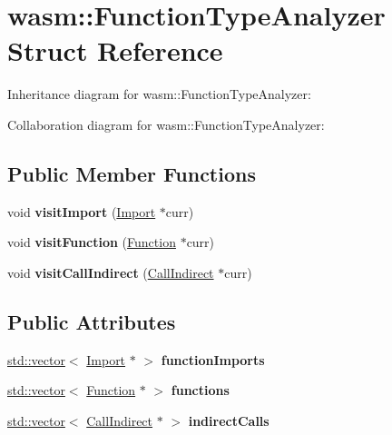 \hypertarget{structwasm_1_1_function_type_analyzer}{}\section{wasm\+:\+:Function\+Type\+Analyzer Struct Reference}
\label{structwasm_1_1_function_type_analyzer}


Inheritance diagram for wasm\+:\+:Function\+Type\+Analyzer\+:


Collaboration diagram for wasm\+:\+:Function\+Type\+Analyzer\+:
\subsection*{Public Member Functions}
\begin{DoxyCompactItemize}
\item 
\mbox{\label{structwasm_1_1_function_type_analyzer_a40df757d6f8b733f38a118ea64ba549b}} 
void {\bfseries visit\+Import} (\mbox{\hyperlink{classwasm_1_1_import}{Import}} $\ast$curr)
\item 
\mbox{\label{structwasm_1_1_function_type_analyzer_a0a88dd9b7d6d5c727b93adce84d9a6b5}} 
void {\bfseries visit\+Function} (\mbox{\hyperlink{classwasm_1_1_function}{Function}} $\ast$curr)
\item 
\mbox{\label{structwasm_1_1_function_type_analyzer_a985049698b77897a5a0c0c74ec42bcbc}} 
void {\bfseries visit\+Call\+Indirect} (\mbox{\hyperlink{classwasm_1_1_call_indirect}{Call\+Indirect}} $\ast$curr)
\end{DoxyCompactItemize}
\subsection*{Public Attributes}
\begin{DoxyCompactItemize}
\item 
\mbox{\label{structwasm_1_1_function_type_analyzer_ad93debb16aed82f5f87a735d092a5f3e}} 
\mbox{\hyperlink{classstd_1_1vector}{std\+::vector}}$<$ \mbox{\hyperlink{classwasm_1_1_import}{Import}} $\ast$ $>$ {\bfseries function\+Imports}
\item 
\mbox{\label{structwasm_1_1_function_type_analyzer_ae34ba87e22f41e1a43e3baee7177f13d}} 
\mbox{\hyperlink{classstd_1_1vector}{std\+::vector}}$<$ \mbox{\hyperlink{classwasm_1_1_function}{Function}} $\ast$ $>$ {\bfseries functions}
\item 
\mbox{\label{structwasm_1_1_function_type_analyzer_a36d0b1db21556f86f8358835d21a1ee0}} 
\mbox{\hyperlink{classstd_1_1vector}{std\+::vector}}$<$ \mbox{\hyperlink{classwasm_1_1_call_indirect}{Call\+Indirect}} $\ast$ $>$ {\bfseries indirect\+Calls}
\end{DoxyCompactItemize}
